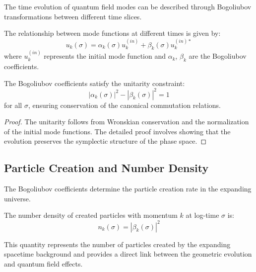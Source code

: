 The time evolution of quantum field modes can be described through Bogoliubov transformations between different time slices.

\begin{definition}
The relationship between mode functions at different times is given by:
\begin{equation}
u_k(\sigma) = \alpha_k(\sigma) u_k^{(in)} + \beta_k(\sigma) u_k^{(in)*}
\label{eq:bogoliubov_transformation}
\end{equation}
where $u_k^{(in)}$ represents the initial mode function and $\alpha_k$, $\beta_k$ are the Bogoliubov coefficients.
\end{definition}

\begin{theorem}
\label{thm:bogoliubov_unitarity}
The Bogoliubov coefficients satisfy the unitarity constraint:
\begin{equation}
|\alpha_k(\sigma)|^2 - |\beta_k(\sigma)|^2 = 1
\label{eq:bogoliubov_unitarity}
\end{equation}
for all $\sigma$, ensuring conservation of the canonical commutation relations.
\end{theorem}

\begin{proof}
The unitarity follows from Wronskian conservation and the normalization of the initial mode functions. The detailed proof involves showing that the evolution preserves the symplectic structure of the phase space.
\end{proof}

\subsection{Particle Creation and Number Density}
\label{subsec:particle_creation}

The Bogoliubov coefficients determine the particle creation rate in the expanding universe.

\begin{theorem}
\label{thm:particle_number}
The number density of created particles with momentum $k$ at log-time $\sigma$ is:
\begin{equation}
n_k(\sigma) = |\beta_k(\sigma)|^2
\label{eq:particle_number}
\end{equation}
\end{theorem}

This quantity represents the number of particles created by the expanding spacetime background and provides a direct link between the geometric evolution and quantum field effects.

